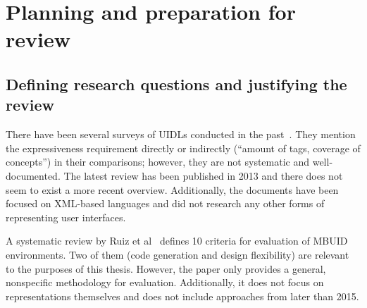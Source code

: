 \section[Planning and preparation]{Planning and preparation for review}\label{sec:planning-and-preparation-for-review}

\subsection{Defining research questions and justifying the review}\label{subsec:defining-research-questions-and-justifying-the-review}

There have been several surveys of UIDLs conducted in the past~\cite{Souchon2003, guerrero_garcia_theoretical_2009, guerrero_garcia_theoretical_2011, Jovanovic2013}.
They mention the expressiveness requirement directly or indirectly (\enquote{amount of tags, coverage of concepts}) in their comparisons;
however, they are not systematic and well-documented.
The latest review has been published in 2013 and there does not seem to exist a more recent overview.
Additionally, the documents have been focused on XML-based languages and did not research any other forms of representing user interfaces.

A systematic review by Ruiz et al~\cite{Ruiz2018} defines 10 criteria for evaluation of MBUID environments.
Two of them (code generation and design flexibility) are relevant to the purposes of this thesis.
However, the paper only provides a general, nonspecific methodology for evaluation.
Additionally, it does not focus on representations themselves and does not include approaches from later than 2015.

